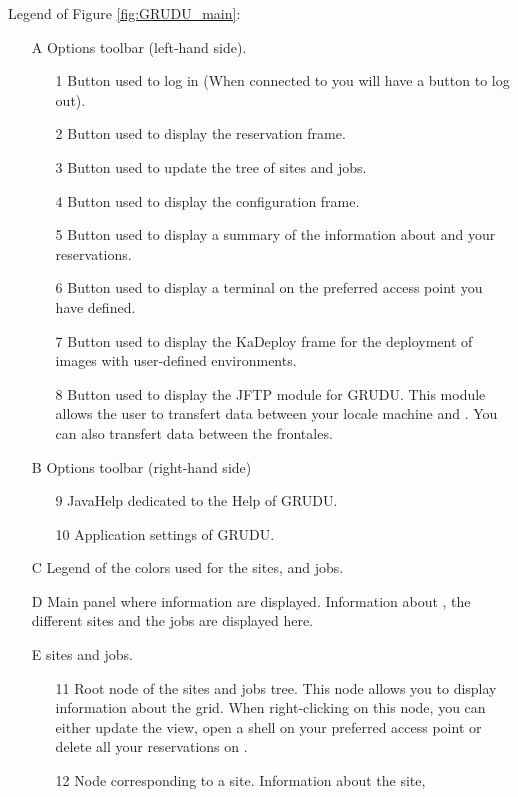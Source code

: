Legend of Figure \ref{fig:GRUDU_main}:
\begin{itemize}
  \item[A] Options toolbar (left-hand side).
  \begin{itemize}
    \item[1] Button used to log in \gfk (When connected to \gfk you will have a
    button to log out).
    \item[2] Button used to display the reservation frame.
    \item[3] Button used to update the \gfk tree of sites and jobs.
    \item[4] Button used to display the configuration frame.
    \item[5] Button used to display a summary of the information about \gfk and
    your reservations.
    \item[6] Button used to display a terminal on the preferred access point you
    have defined.
    \item[7] Button used to display the KaDeploy frame for the deployment of
    images with user-defined environments.
    \item[8] Button used to display the JFTP module for GRUDU. This module
    allows the user to transfert data between your locale machine and \gfk. You
    can also transfert data between the \gfk frontales.
  \end{itemize}
  \item[B] Options toolbar (right-hand side)
  \begin{itemize}
    \item[9] JavaHelp dedicated to the Help of GRUDU.
    \item[10] Application settings of GRUDU.
  \end{itemize}
  \item[C] Legend of the colors used for the sites, and jobs.
  \item[D] Main panel where information are displayed. Information about \gfk,
  the different sites and the jobs are displayed here.\item[]
  \item[E] \gfk sites and jobs.
  \begin{itemize}
    \item[11] Root node of the \gfk sites and jobs tree. This node
    allows you to display information about the grid. When right-clicking on this
    node, you can either update the \gfk view, open a shell on your preferred
    access point or delete all your reservations on \gfk.
    \item[12] Node corresponding to a site. Information about the site,

\end{itemize}
\end{itemize}

